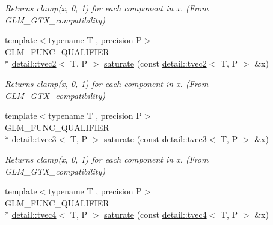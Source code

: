 \begin{DoxyCompactItemize}
\begin{DoxyCompactList}\small\item\em Returns clamp(x, 0, 1) for each component in x. (From G\-L\-M\-\_\-\-G\-T\-X\-\_\-compatibility) \end{DoxyCompactList}\item 
\hypertarget{group__gtx__compatibility_gab7c26da683d068e34feaa3ae90a528c1}{{\footnotesize template$<$typename T , precision P$>$ }\\G\-L\-M\-\_\-\-F\-U\-N\-C\-\_\-\-Q\-U\-A\-L\-I\-F\-I\-E\-R \\*
\hyperlink{structglm_1_1detail_1_1tvec2}{detail\-::tvec2}$<$ T, P $>$ \hyperlink{group__gtx__compatibility_gab7c26da683d068e34feaa3ae90a528c1}{saturate} (const \hyperlink{structglm_1_1detail_1_1tvec2}{detail\-::tvec2}$<$ T, P $>$ \&x)}\label{group__gtx__compatibility_gab7c26da683d068e34feaa3ae90a528c1}

\begin{DoxyCompactList}\small\item\em Returns clamp(x, 0, 1) for each component in x. (From G\-L\-M\-\_\-\-G\-T\-X\-\_\-compatibility) \end{DoxyCompactList}\item 
\hypertarget{group__gtx__compatibility_ga367b1adb1d748e156db972cc92b42483}{{\footnotesize template$<$typename T , precision P$>$ }\\G\-L\-M\-\_\-\-F\-U\-N\-C\-\_\-\-Q\-U\-A\-L\-I\-F\-I\-E\-R \\*
\hyperlink{structglm_1_1detail_1_1tvec3}{detail\-::tvec3}$<$ T, P $>$ \hyperlink{group__gtx__compatibility_ga367b1adb1d748e156db972cc92b42483}{saturate} (const \hyperlink{structglm_1_1detail_1_1tvec3}{detail\-::tvec3}$<$ T, P $>$ \&x)}\label{group__gtx__compatibility_ga367b1adb1d748e156db972cc92b42483}

\begin{DoxyCompactList}\small\item\em Returns clamp(x, 0, 1) for each component in x. (From G\-L\-M\-\_\-\-G\-T\-X\-\_\-compatibility) \end{DoxyCompactList}\item 
\hypertarget{group__gtx__compatibility_gaad58ab5081f38e91ba5a99a25ba6270c}{{\footnotesize template$<$typename T , precision P$>$ }\\G\-L\-M\-\_\-\-F\-U\-N\-C\-\_\-\-Q\-U\-A\-L\-I\-F\-I\-E\-R \\*
\hyperlink{structglm_1_1detail_1_1tvec4}{detail\-::tvec4}$<$ T, P $>$ \hyperlink{group__gtx__compatibility_gaad58ab5081f38e91ba5a99a25ba6270c}{saturate} (const \hyperlink{structglm_1_1detail_1_1tvec4}{detail\-::tvec4}$<$ T, P $>$ \&x)}\label{group__gtx__compatibility_gaad58ab5081f38e91ba5a99a25ba6270c}


\end{DoxyCompactItemize}
